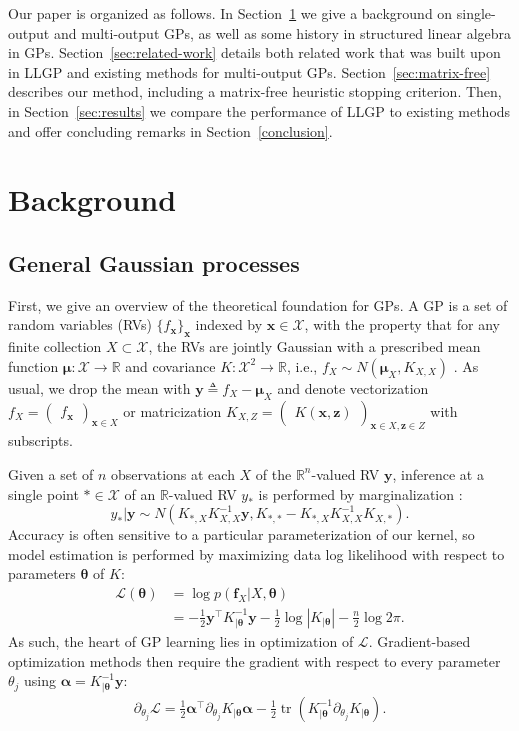 \documentclass{article}
\def\bsa{{\boldsymbol\alpha}}
\def\bsm{{\boldsymbol\mu}}
\def\bsth{{\boldsymbol\theta}}
\newcommand{\pa}[1]{ \left({#1}\right) }
\def \mcL {\mathcal{L}}
\def \R {\mathbb{R}}
\def\Tx{\textbf{x}}
\def\Ty{\textbf{y}}
\def\Tz{\textbf{z}}
\def\Tf{\textbf{f}}
\newcommand{\colv}[1]{\begin{pmatrix} #1 \end{pmatrix}}
\newcommand{\mat}[1]{\begin{pmatrix} #1 \end{pmatrix}}
\newcommand{\abs}[1]{\left|#1\right|}
\DeclareMathOperator{\Tr}{tr}
\def \mcX {\mathcal{X}}
\begin{document}
Our paper is organized as follows. In Section~\ref{sec:background} we give a background on single-output and multi-output GPs, as well as some history in structured linear algebra in GPs. Section~\ref{sec:related-work} details both related work that was built upon in LLGP and existing methods for multi-output GPs. Section~\ref{sec:matrix-free} describes our method, including a matrix-free heuristic stopping criterion. Then, in Section~\ref{sec:results} we compare the performance of LLGP to existing methods and offer concluding remarks in Section~\ref{conclusion}.

\section{Background}
\label{sec:background}
\subsection{General Gaussian processes}

First, we give an overview of the theoretical foundation for GPs. A GP is a set of random variables (RVs) $\{f_\Tx\}_\Tx$ indexed by $\Tx\in\mcX$, with the property that for any finite collection $X\subset\mcX$, the RVs are jointly Gaussian with a prescribed mean function $\bsm:\mcX\rightarrow\R$ and covariance $K:\mcX^2\rightarrow\R$, i.e., $f_X\sim N\pa{\bsm_X, K_{X, X}}$ \cite{williams1996gaussian}. As usual, we drop the mean with $\Ty\triangleq f_X-\bsm_X$ and denote vectorization $f_X=\colv{f_{\Tx}}_{\Tx\in X}$ or matricization $K_{X,Z}=\mat{K(\Tx,\Tz)}_{\Tx\in X,\Tz\in Z}$ with subscripts.

Given a set of $n$ observations at each $X$ of the $\R^n$-valued RV $\Ty$, inference at a single point $*\in\mcX$ of an $\R$-valued RV $y_*$ is performed by marginalization \cite{gpml}:
\begin{equation*}
y_*|\Ty\sim N\pa{K_{*, {X}}K^{-1}_{{X}, {X}}\Ty, K_{*, *}-K_{*, {X}}K^{-1}_{{X}, {X}}K_{{X}, *}}.
\end{equation*}
Accuracy is often sensitive to a particular parameterization of our kernel, so model estimation is performed by maximizing data log likelihood with respect to parameters $\bsth$ of $K$:
\begin{align}
  \mcL(\bsth)&=\log p(\Tf_{X}|X,\bsth)\label{datall}\\
             &=-\frac{1}{2}\Ty^\top K_{|\bsth}^{-1}\Ty-\frac{1}{2}\log \abs{K_{|\bsth}}-\frac{n}{2}\log 2\pi.
\end{align}
As such, the heart of GP learning lies in optimization of $\mcL$. Gradient-based optimization methods then require the gradient with respect to every parameter $\theta_j$ using $\bsa=K_{|\bsth}^{-1}\Ty$:
\begin{align}
\partial_{\theta_j}\mcL = \frac{1}{2}\bsa^\top\partial_{\theta_j}K_{|\bsth}\bsa -\frac{1}{2}\Tr\pa{K_{|\bsth}^{-1}\partial_{\theta_j}K_{|\bsth}}.\label{llgradient}
\end{align}
\end{document}
